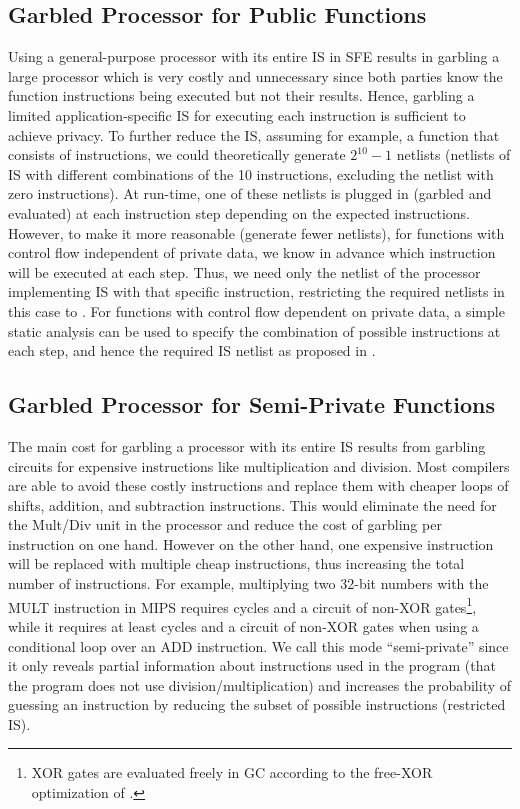 \subsection{Garbled Processor for Public Functions}\label{ssec:processor-mips-sfe-public}
Using a general-purpose processor with its entire IS in SFE results in garbling a large processor which is very costly and unnecessary since both parties know the function instructions being executed but not their results.
Hence, garbling a limited application-specific IS for executing each instruction is sufficient to achieve privacy.
To further reduce the IS, assuming for example, a function that consists of  instructions, we could theoretically generate $2^{10} -1$ netlists (netlists of IS with different combinations of the 10 instructions, excluding the netlist with zero instructions).
At run-time, one of these netlists is plugged in (garbled and evaluated) at each instruction step depending on the expected instructions.
However, to make it more reasonable (generate fewer netlists), for functions with control flow independent of private data, we know in advance which instruction will be executed at each step.
Thus, we need only the netlist of the processor implementing IS with that specific instruction, restricting the required netlists in this case to .
For functions with control flow dependent on private data, a simple static analysis can be used to specify the combination of possible instructions at each step, and hence the required IS netlist as proposed in \cite{wang2016secure}.

\subsection{Garbled Processor for Semi-Private Functions}\label{ssec:processor-mips-sfe-semiprivate}
The main cost for garbling a processor with its entire IS results from garbling circuits for expensive instructions like multiplication and division.
Most compilers are able to avoid these costly instructions and replace them with cheaper loops of shifts, addition, and subtraction instructions.
This would eliminate the need for the Mult/Div unit in the processor and reduce the cost of garbling per instruction on one hand.
However on the other hand, one expensive instruction will be replaced with multiple cheap instructions, thus increasing the total number of instructions.
For example, multiplying two 32-bit numbers with the MULT instruction in MIPS requires  cycles and a circuit of  non-XOR gates\footnote{XOR gates are evaluated freely in GC according to the free-XOR optimization of \cite{kolesnikov2008improved}.}, while it requires at least  cycles and a circuit of  non-XOR gates when using a conditional loop over an ADD instruction.
We call this mode ``semi-private'' since it only reveals partial information about instructions used in the program (that the program does not use division/multiplication) and increases the probability of guessing an instruction by reducing the subset of possible instructions (restricted IS).

